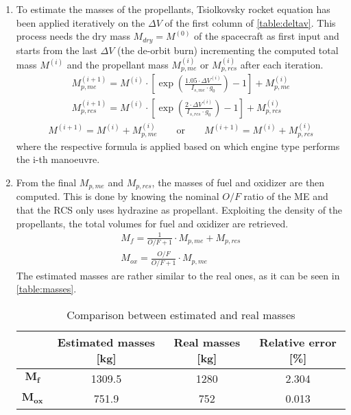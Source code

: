\begin{enumerate}[itemsep=5mm]
    \item
    To estimate the masses of the propellants, Tsiolkovsky rocket equation has been applied iteratively on the $\Delta V$ of the first column of \autoref{table:deltav}. This process needs the dry mass $M_{dry} = M^{(0)}$ of the spacecraft as first input and starts from the last $\Delta V$ (the de-orbit burn) incrementing the computed total mass $M^{(i)}$ and the propellant mass $M_{p,me}^{(i)}$ or $M_{p,rcs}^{(i)}$ after each iteration.
    \begin{gather}
        M_{p,me}^{(i+1)} = M^{(i)} \cdot \left[ \exp \left( \frac{1.05 \cdot \Delta V^{(i)}} {I_{s,me} \cdot g_0} \right) - 1 \right] + M_{p,me}^{(i)} 
        \label{eq:me_iteration} \\
        M_{p,rcs}^{(i+1)} = M^{(i)} \cdot \left[ \exp \left( \frac{2 \cdot \Delta V^{(i)}} {I_{s,rcs} \cdot g_0} \right) - 1 \right] + M_{p,rcs}^{(i)}
        \label{eq:rcs_iteration}
    \end{gather}
    \begin{gather}
        M^{(i+1)} = M^{(i)} + M_{p,me}^{(i)}
        \qquad \textrm{or} \qquad
        M^{(i+1)} = M^{(i)} + M_{p,rcs}^{(i)}
    \end{gather}
    where the respective formula is applied based on which engine type performs the i-th manoeuvre.
    
    \item
    From the final $M_{p,me}$ and $M_{p,rcs}$, the masses of fuel and oxidizer are then computed. This is done by knowing the nominal $O/F$ ratio of the ME \cite{Leros} and that the RCS only uses hydrazine as propellant.
    Exploiting the density of the propellants, the total volumes for fuel and oxidizer are retrieved.
    \begin{gather}
        M_{f} = \frac{1}{O/F + 1} \cdot M_{p,me} + M_{p,rcs} 
        \\
        M_{ox} = \frac{O/F}{O/F + 1} \cdot M_{p,me}
    \end{gather}
    The estimated masses are rather similar to the real ones, as it can be seen in \autoref{table:masses}.

    \begin{table}[H]
        \renewcommand{\arraystretch}{1.3}
        \centering
        \begin{tabular}{|c|c|c|c|}
            \hline
            & \textbf{Estimated masses [kg]} & \textbf{Real masses [kg]} \cite{masses_ref} & \textbf{Relative error [\%]} \\
            \hline
            $\boldsymbol{M_{f}}$ & 1309.5 & 1280 & 2.304 \\
            \hline
            $\boldsymbol{M_{ox}}$ & 751.9 & 752 & 0.013 \\
            \hline
        \end{tabular}
        \caption{Comparison between estimated and real masses}
        \label{table:masses}
    \end{table}


\end{enumerate}
